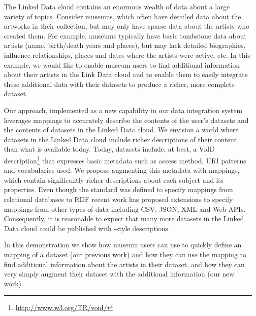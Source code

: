 The Linked Data cloud contains an enormous wealth of data about a large variety of topics.
Consider museums, which often have detailed data about the artworks in their collection, but may only have sparse data about the artists who created them.
For example, museums typically have basic tombstone data about artists (name, birth/death years and places), but may lack detailed biographies, influence relationships, places and dates where the artists were active, etc.
In this example, we would like to enable museum users to find additional information about their artists in the Link Data cloud and to enable them to easily integrate these additional data with their datasets to produce a richer, more complete dataset.

Our approach, implemented as a new capability in our \karma data integration system~\cite{knoblock12:eswc} leverages \rtworml mappings  to accurately describe the contents of the user's datasets and the contents of datasets in the Linked Data cloud.
We envision a world where datasets in the Linked Data cloud include richer descriptions of their content than what is available today.
Today, datasets include, at best, a VoID description\footnote{\url{http://www.w3.org/TR/void/}} that expresses basic metadata such as access method, URI patterns and vocabularies used.
We propose augmenting this metadata with \rtworml mappings, which contain significantly richer descriptions about each subject and its properties.
Even though the \rtworml standard was defined to specify mappings from relational databases to RDF recent work  has proposed extensions to specify mappings from other types of data including CSV, JSON, XML and Web APIs.
Consequently, it is reasonable to expect that many more datasets in the Linked Data cloud could be published with \rtworml-style descriptions.

In this demonstration we show how museum users can use \karma to quickly define an \rtworml mapping of a dataset (our previous work) and how they can use the \rtworml mapping to find additional information about the artists in their dataset, and how they can very simply augment their dataset with the additional information (our new work).

